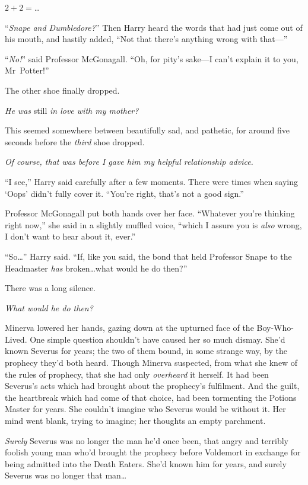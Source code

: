 $2 + 2 = $…

“\emph{Snape and Dumbledore?}” Then Harry heard the words that had just come out of his mouth, and hastily added, “Not that there’s anything wrong with that—”

“\emph{No!}” said Professor McGonagall. “Oh, for pity’s sake—I can’t explain it to you, Mr~Potter!”

The other shoe finally dropped.

\emph{He was} still \emph{in love with my mother?}

This seemed somewhere between beautifully sad, and pathetic, for around five seconds before the \emph{third} shoe dropped.

\emph{Of course, that was before I gave him my helpful relationship advice.}

“I see,” Harry said carefully after a few moments. There were times when saying ‘Oops’ didn’t fully cover it. “You’re right, that’s not a good sign.”

Professor McGonagall put both hands over her face. “Whatever you’re thinking right now,” she said in a slightly muffled voice, “which I assure you is \emph{also} wrong, I don’t want to hear about it, ever.”

“So…” Harry said. “If, like you said, the bond that held Professor Snape to the Headmaster \emph{has} broken…what would he do then?”

There was a long silence.

\later

\emph{What would he do then?}

Minerva lowered her hands, gazing down at the upturned face of the Boy-Who-Lived. One simple question shouldn’t have caused her so much dismay. She’d known Severus for years; the two of them bound, in some strange way, by the prophecy they’d both heard. Though Minerva suspected, from what she knew of the rules of prophecy, that she had only \emph{overheard} it herself. It had been Severus’s acts which had brought about the prophecy’s fulfilment. And the guilt, the heartbreak which had come of that choice, had been tormenting the Potions Master for years. She couldn’t imagine who Severus would be without it. Her mind went blank, trying to imagine; her thoughts an empty parchment.

\emph{Surely} Severus was no longer the man he’d once been, that angry and terribly foolish young man who’d brought the prophecy before Voldemort in exchange for being admitted into the Death Eaters. She’d known him for years, and surely Severus was no longer that man…

